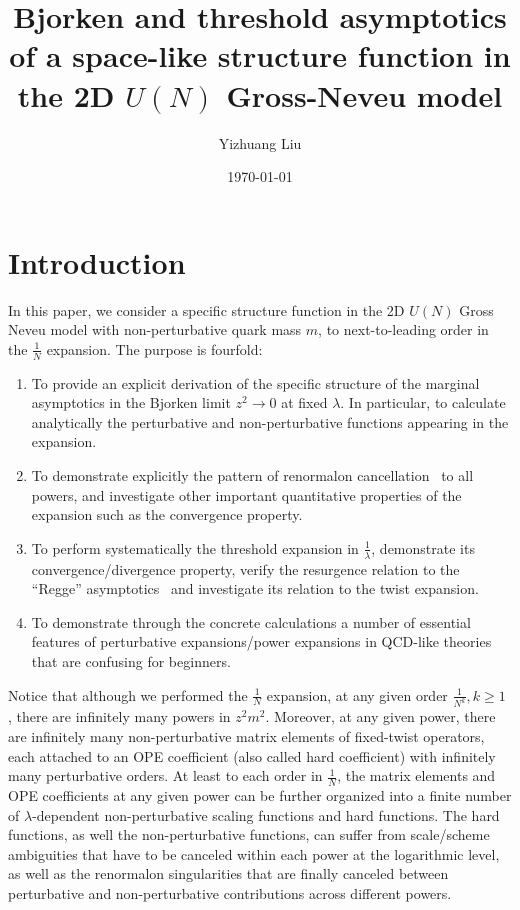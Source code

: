 \documentclass[a4paper,11pt]{article}
\title{Bjorken and threshold asymptotics of a space-like structure function in the 2D $U(N)$ Gross-Neveu model}
\author[a]{Yizhuang Liu}
\affiliation[a]{Institute of Theoretical Physics,
Jagiellonian University, 30-348 Kraków, Poland}
\date{\today}
\begin{document}
\maketitle
\flushbottom
\section{Introduction}
In this paper, we consider a specific structure function in the 2D $U(N)$ Gross Neveu model with non-perturbative quark mass $m$, to next-to-leading order in the $\frac{1}{N}$ expansion. The purpose is fourfold:
\begin{enumerate}
    \item To provide an explicit derivation of the specific structure of the marginal asymptotics in the Bjorken limit $z^2\rightarrow 0$ at fixed $\lambda$. In particular, to calculate analytically the perturbative and non-perturbative functions appearing in the expansion.     
 \item To demonstrate explicitly the pattern of renormalon cancellation~\cite{Shifman:1978bx,David:1983gz,David:1985xj,Mueller:1984vh,Ji:1994md,Beneke:1998ui,Beneke:1998eq,Braun:2004bu,  Shifman:2013uka,Dunne:2015eoa} to all powers, and investigate other important quantitative properties of the expansion such as the convergence property. 
    \item To perform systematically the threshold expansion in $\frac{1}{\lambda}$, demonstrate its convergence/divergence property, verify the resurgence relation to the ``Regge'' asymptotics~\cite{Basso:2006nk} and investigate its relation to the twist expansion.
    \item To demonstrate through the concrete calculations a number of essential features of perturbative expansions/power expansions in QCD-like theories that are confusing for beginners. 

    
\end{enumerate}
Notice that although we performed the $\frac{1}{N}$ expansion,  at any given order $\frac{1}{N^k}, k\ge 1$ , there are infinitely many powers in $z^2m^2$. Moreover, at any given power, there 
are infinitely many non-perturbative matrix elements of fixed-twist operators, each attached to an OPE coefficient (also called hard coefficient) with infinitely many perturbative orders. At least to each order in $\frac{1}{N}$, the matrix elements and OPE coefficients at any given power can be further organized into a finite number of $\lambda$-dependent non-perturbative scaling functions and hard functions. The hard functions, as well the non-perturbative functions, can suffer from scale/scheme ambiguities that have to be canceled within each power at the logarithmic level, as well as the renormalon singularities that are finally canceled between  perturbative and non-perturbative contributions across different powers.  
\end{document}
